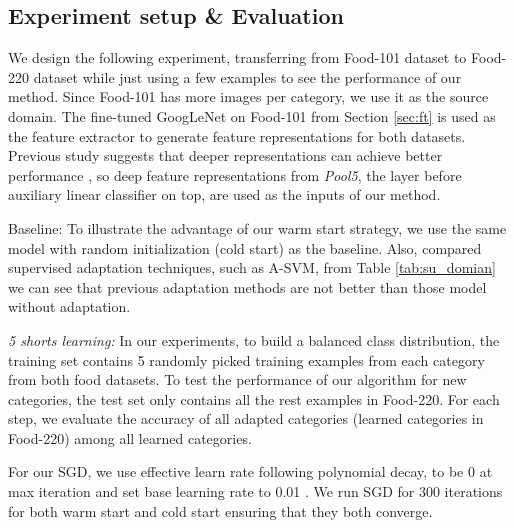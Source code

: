 \subsection{Experiment setup \& Evaluation}
We design the following experiment, transferring from Food-101 dataset to Food-220 dataset while just using a few examples to see the performance of our method. Since Food-101 has more images per category, we use it as the source domain. The fine-tuned GoogLeNet on Food-101 from Section \ref{sec:ft} is used as the feature extractor to generate feature representations for both datasets. Previous study suggests that deeper representations can achieve better performance \cite{hoffman2013one}, so deep feature representations from \emph{Pool5}, the layer before auxiliary linear classifier on top, are used as the inputs of our method.


Baseline: To illustrate the advantage of our warm start strategy, we use the same model with random initialization (cold start) as the baseline.
Also, compared supervised adaptation techniques, such as A-SVM, from Table \ref{tab:su_domian} we can see that previous adaptation methods are not better than those model without adaptation.%

\emph{5 shorts learning:} In our experiments, to build a balanced class distribution, the training set contains 5 randomly picked training examples from each category from both food datasets. To test the performance of our algorithm for new categories, the test set only contains all the rest examples in Food-220. For each step, we evaluate the accuracy of all adapted categories (learned categories in Food-220) among all learned categories.

For our SGD, we use effective learn rate following polynomial decay, to be 0 at max iteration and set base learning rate to 0.01 \cite{jia2014caffe}. We run SGD for 300 iterations for both warm start and cold start ensuring that they both converge.


